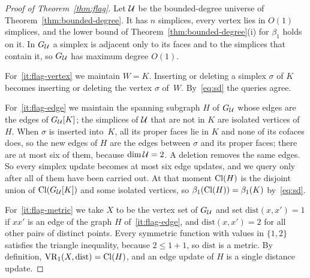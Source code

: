 \begin{proof}[Proof of Theorem~\ref{thm:flag}]
Let $\mathcal{U}$ be the bounded-degree universe of Theorem~\ref{thm:bounded-degree}.
It has $n$ simplices, every vertex lies in $O(1)$ simplices, and the lower bound of Theorem~\ref{thm:bounded-degree}(i) for $\beta_1$ holds on it.
In $G_{\mathcal{U}}$ a simplex is adjacent only to its faces and to the simplices that contain it, so $G_{\mathcal{U}}$ has maximum degree $O(1)$.

For~\ref{it:flag-vertex} we maintain $W=K$.
Inserting or deleting a simplex $\sigma$ of $K$ becomes inserting or deleting the vertex $\sigma$ of~$W$.
By~\eqref{eq:sd} the queries agree.

For~\ref{it:flag-edge} we maintain the spanning subgraph $H$ of $G_{\mathcal{U}}$ whose edges are the edges of $G_{\mathcal{U}}[K]$; the simplices of $\mathcal{U}$ that are not in $K$ are isolated vertices of~$H$.
When $\sigma$ is inserted into~$K$, all its proper faces lie in $K$ and none of its cofaces does, so the new edges of $H$ are the edges between $\sigma$ and its proper faces; there are at most six of them, because $\dim\mathcal{U}=2$.
A deletion removes the same edges.
So every simplex update becomes at most six edge updates, and we query only after all of them have been carried out.
At that moment $\mathrm{Cl}(H)$ is the disjoint union of $\mathrm{Cl}(G_{\mathcal{U}}[K])$ and some isolated vertices, so $\beta_1(\mathrm{Cl}(H))=\beta_1(K)$ by~\eqref{eq:sd}.

For~\ref{it:flag-metric} we take $X$ to be the vertex set of $G_{\mathcal{U}}$ and set $\mathrm{dist}(x,x')=1$ if $xx'$ is an edge of the graph $H$ of~\ref{it:flag-edge}, and $\mathrm{dist}(x,x')=2$ for all other pairs of distinct points.
Every symmetric function with values in $\{1,2\}$ satisfies the triangle inequality, because $2\le1+1$, so $\mathrm{dist}$ is a metric.
By definition, $\mathrm{VR}_1(X,\mathrm{dist})=\mathrm{Cl}(H)$, and an edge update of $H$ is a single distance update.


\end{proof}
